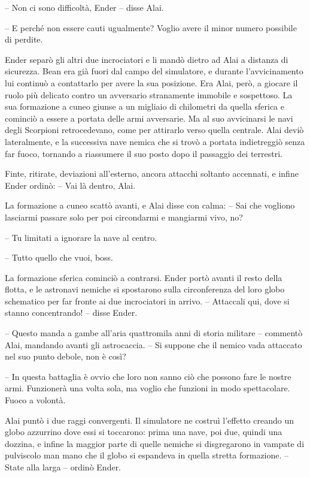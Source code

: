 {-- Non ci sono difficoltà, Ender -- disse Alai.}

{-- E perché non essere cauti ugualmente? Voglio avere il minor numero
	possibile di perdite.}

{Ender separò gli altri due incrociatori e li mandò dietro ad Alai a
	distanza di sicurezza. Bean era già fuori dal campo del simulatore, e
	durante l'avvicinamento lui continuò a contattarlo per avere la sua
	posizione. Era Alai, però, a giocare il ruolo più delicato contro un
	avversario stranamente immobile e sospettoso. La sua formazione a cuneo
	giunse a un migliaio di chilometri da quella sferica e cominciò a essere
	a portata delle armi avversarie. Ma al suo avvicinarsi le navi degli
	Scorpioni retrocedevano, come per attirarlo verso quella centrale. Alai
	deviò lateralmente, e la successiva nave nemica che si trovò a portata
	indietreggiò senza far fuoco, tornando a riassumere il suo posto dopo il
	passaggio dei terrestri.}

{Finte, ritirate, deviazioni all'esterno, ancora attacchi soltanto
	accennati, e infine Ender ordinò: -- Vai là dentro, Alai.}

{La formazione a cuneo scattò avanti, e Alai disse con calma: -- Sai che
	vogliono lasciarmi passare solo per poi circondarmi e mangiarmi vivo,
	no?}

{-- Tu limitati a ignorare la nave al centro.}

{-- Tutto quello che vuoi, boss.}

{La formazione sferica cominciò a contrarsi. Ender portò avanti il resto
	della flotta, e le astronavi nemiche si spostarono sulla circonferenza
	del loro globo schematico per far fronte ai due incrociatori in arrivo.
	-- Attaccali qui, dove si stanno concentrando! -- disse Ender.}

{-- Questo manda a gambe all'aria quattromila anni di storia militare --
	commentò Alai, mandando avanti gli astrocaccia. -- Si suppone che il
	nemico vada attaccato nel suo punto debole, non è così?}

{-- In questa battaglia è ovvio che loro non sanno ciò che possono fare
	le nostre armi. Funzionerà una volta sola, ma voglio che funzioni in
	modo spettacolare. Fuoco a volontà.}

{Alai puntò i due raggi convergenti. Il simulatore ne costruì l'effetto
	creando un globo azzurrino dove essi si toccarono: prima una nave, poi
	due, quindi una dozzina, e infine la maggior parte di quelle nemiche si
	disgregarono in vampate di pulviscolo man mano che il globo si espandeva
	in quella stretta formazione. -- State alla larga -- ordinò Ender.}

